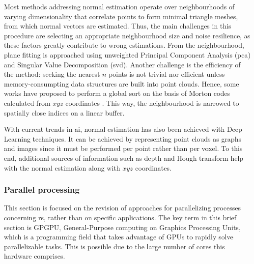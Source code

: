 Most methods addressing normal estimation operate over neighbourhoods of varying dimensionality that correlate points to form minimal triangle meshes, from which normal vectors are estimated. Thus, the main challenges in this procedure are selecting an appropriate neighbourhood size and noise resilience, as these factors greatly contribute to wrong estimations. From the neighbourhood, plane fitting is approached using unweighted Principal Component Analysis (\acrshort{pca}) and Singular Value Decomposition (\acrshort{svd}). Another challenge is the efficiency of the method: seeking the nearest $n$ points is not trivial nor efficient unless memory-consumpting data structures are built into point clouds. Hence, some works have proposed to perform a global sort on the basis of Morton codes calculated from $\textit{xyz}$ coordinates \cite{jakob_optimizing_2021}. This way, the neighbourhood is narrowed to spatially close indices on a linear buffer.

With current trends in \acrshort{ai}, normal estimation has also been achieved with Deep Learning techniques. It can be achieved by representing point clouds as graphs \cite{lenssen_deep_2020} and images \cite{zeng_deep_2019, boulch_deep_2016} since it must be performed per point rather than per voxel. To this end, additional sources of information such as depth and Hough transform \cite{boulch_deep_2016} help with the normal estimation along with $\textit{xyz}$ coordinates. 

\subsubsection{Parallel processing}

This section is focused on the revision of approaches for parallelizing processes concerning \acrshort{rs}, rather than on specific applications. The key term in this brief section is GPGPU, General-Purpose computing on Graphics Processing Units, which is a programming field that takes advantage of GPUs to rapidly solve parallelizable tasks. This is possible due to the large number of cores this hardware comprises. 

